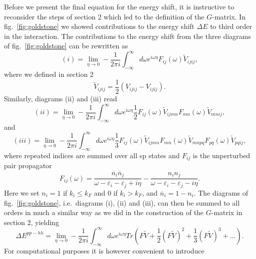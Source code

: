 Before we present the final equation for the energy shift, it is instructive
to reconsider the steps of section 2 which led to the definition of
the $G$-matrix. In fig.\ \ref{fig:goldstone} we showed
contributions to the energy shift $\Delta E$ to third order in the
interaction.
The contributions to the energy shift from the three diagrams
of fig.\ \ref{fig:goldstone} can be rewritten as
\begin{equation}
   (i)=\lim_{\eta \rightarrow 0}
       -\frac{1}{2\pi i}\int_{-\infty}^{\infty}
       d\omega e^{i\omega\eta}F_{ij}(\omega)\tilde{V}_{ijij},
\end{equation}
where we defined in section 2
\begin{equation}
     \tilde{V}_{ijij}=\frac{1}{2}
     (V_{ijij}-V_{ijij}).
\end{equation}
Similarly, diagrams (ii) and (iii) read
\begin{equation}
   (ii)=\lim_{\eta \rightarrow 0}
       -\frac{1}{2\pi i}\int_{-\infty}^{\infty}
       d\omega e^{i\omega\eta}\frac{1}{2}F_{ij}(\omega)
       \tilde{V}_{ijmn}F_{mn}(\omega)\tilde{V}_{mnij},
\end{equation}
and
\begin{equation}
   (iii)=\lim_{\eta \rightarrow 0}
       -\frac{1}{2\pi i}\int_{-\infty}^{\infty}
       d\omega e^{i\omega\eta}\frac{1}{3}F_{ij}(\omega)
      \tilde{V}_{ijmn}F_{mn}(\omega)
     \tilde{V}_{mnpq}F_{pq}(\omega )\tilde{V}_{pqij},
   \label{eq:thirdeo}
\end{equation}
where repeated indices are summed over all sp states and $F_{ij}$
is the unperturbed pair propagator
\begin{equation}
    F_{ij}(\omega)=\frac{\overline{n}_i\overline{n}_j}
    {\omega -\varepsilon_i -\varepsilon_j +i\eta}
    -\frac{n_in_j}
    {\omega -\varepsilon_i -\varepsilon_j -i\eta}.
\end{equation}
Here we set $n_i=1$ if $k_i\leq k_F$ and $0$ if $k_i > k_F$, and
$\overline{n}_i=1-n_i$. The diagrams of
fig.\ \ref{fig:goldstone}, i.e.\ diagrams (i), (ii) and (iii),
can then be summed to all orders in much a similar way as we did in the
construction of the $G$-matrix in section 2, yielding
\begin{equation}
   \Delta E^{pp-hh}=\lim_{\eta \rightarrow 0}
       -\frac{1}{2\pi i}\int_{-\infty}^{\infty}
       d\omega e^{i\omega\eta}Tr\left( F\tilde{V}+
        \frac{1}{2}(F\tilde{V})^2+\frac{1}{3}(F\tilde{V})^3
        +\dots\right).
\end{equation}
For computational purposes it is however convenient to introduce
